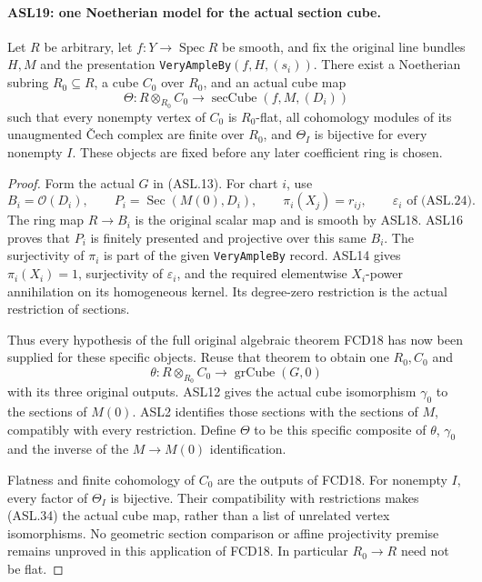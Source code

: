 \documentclass[11pt,a4paper]{article}
\numberwithin{equation}{section}
\theoremstyle{remark}\newtheorem{remark}[theorem]{Remark}
\begin{document}
\paragraph{ASL19: one Noetherian model for the actual section cube.}
\label{claim:ASL19}
Let $R$ be arbitrary, let $f:Y\to\operatorname{Spec}R$ be
smooth, and fix the original line bundles $H,M$ and the
presentation \texttt{Very\allowbreak{}Ample\allowbreak{}By}$(f,H,(s_i))$.
There exist a Noetherian subring $R_0\subseteq R$, a cube
$C_0$ over $R_0$, and an actual cube map
\[
 \Theta:R\otimes_{R_0}C_0
                       \longrightarrow\operatorname{secCube}(f,M,(D_i))
                                                        \tag{ASL.34}
\]
such that every nonempty vertex of $C_0$ is $R_0$-flat,
all cohomology modules of its unaugmented \v Cech complex
are finite over $R_0$, and $\Theta_I$ is bijective for every
nonempty $I$.  These objects are fixed before any later
coefficient ring is chosen.

\begin{proof}
Form the actual $G$ in (ASL.13).  For chart $i$, use
\[
 B_i=\mathcal O(D_i),\qquad
 P_i=\operatorname{Sec}(M(0),D_i),\qquad
 \pi_i(X_j)=r_{ij},\qquad \varepsilon_i\text{ of (ASL.24)}.
\]
The ring map $R\to B_i$ is the original scalar map and is
smooth by ASL18.  ASL16 proves that $P_i$ is finitely
presented and projective over this same $B_i$.
The surjectivity of $\pi_i$ is part of the given
\texttt{Very\allowbreak{}Ample\allowbreak{}By} record.  ASL14 gives
$\pi_i(X_i)=1$, surjectivity of $\varepsilon_i$, and the
required elementwise $X_i$-power annihilation on its
homogeneous kernel.  Its degree-zero restriction is the
actual restriction of sections.

Thus every hypothesis of the full original algebraic theorem
FCD18 has now been supplied for these specific objects.
Reuse that theorem to obtain one $R_0,C_0$ and
\[
          \theta:R\otimes_{R_0}C_0
                          \longrightarrow\operatorname{grCube}(G,0)
\]
with its three original outputs.  ASL12 gives the actual
cube isomorphism $\gamma_0$ to the sections of $M(0)$.
ASL2 identifies those sections with the sections of $M$,
compatibly with every restriction.  Define $\Theta$ to be
this specific composite of $\theta$, $\gamma_0$ and the
inverse of the $M\to M(0)$ identification.

Flatness and finite cohomology of $C_0$ are the outputs of
FCD18.  For nonempty $I$, every factor of $\Theta_I$ is
bijective.  Their compatibility with restrictions makes
(ASL.34) the actual cube map, rather than a list of unrelated
vertex isomorphisms.  No geometric section comparison or
affine projectivity premise remains unproved in this application
of FCD18.  In particular $R_0\to R$ need not be flat.
\end{proof}
\end{document}
